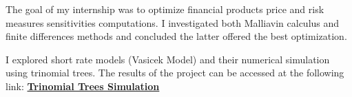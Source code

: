 \documentclass[]{deedy-resume-openfont}
\begin{document}
\begin{minipage}[t]{0.64\textwidth}
\sectionsep

The goal of my internship was to optimize financial products price and risk measures sensitivities computations. I investigated both Malliavin calculus and finite differences methods and concluded the latter offered the best optimization.
\sectionsep

I explored short rate models (Vasicek Model) and their numerical simulation using trinomial trees. The results of the project can be accessed at the following link: \href{http://simulations.lpsm.paris/trinomial_trees/}{\bf Trinomial Trees Simulation}
\sectionsep

\end{minipage} 
\end{document}
